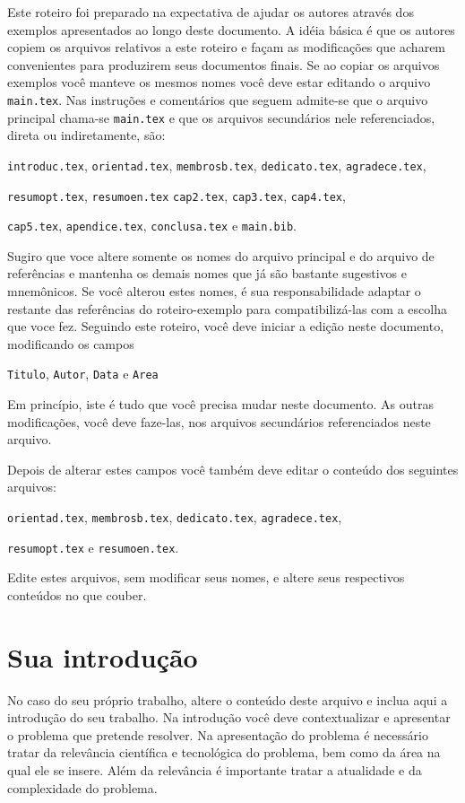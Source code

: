 
Este roteiro foi preparado na expectativa de ajudar os autores através dos
exemplos apresentados ao longo deste documento. A idéia básica é
que os autores copiem os arquivos relativos a este roteiro e façam as
modificações que acharem convenientes para produzirem seus documentos
finais. Se ao copiar os arquivos exemplos você manteve os mesmos nomes
você deve estar editando o arquivo \texttt{main.tex}. Nas
instruções e comentários que seguem admite-se que o arquivo
principal chama-se \texttt{main.tex} e que os arquivos secundários
nele referenciados, direta ou indiretamente, são:

\noindent\texttt{introduc.tex}, \texttt{orientad.tex}, \texttt{membrosb.tex},
\texttt{dedicato.tex}, \texttt{agradece.tex},

\noindent\texttt{resumopt.tex}, \texttt{resumoen.tex}
\texttt{cap2.tex}, \texttt{cap3.tex}, \texttt{cap4.tex},

\noindent\texttt{cap5.tex}, \texttt{apendice.tex},
\texttt{conclusa.tex} e \texttt{main.bib}.

Sugiro que voce altere somente os nomes do arquivo principal e do arquivo de
referências e mantenha os demais nomes que já são bastante
sugestivos e mnemônicos. Se você alterou estes nomes, é sua
responsabilidade adaptar o restante das referências do roteiro-exemplo
para compatibilizá-las com a escolha que voce fez. Seguindo este roteiro,
você deve iniciar a edição neste documento, modificando os campos

\noindent\texttt{Titulo}, \texttt{Autor}, \texttt{Data} e
\texttt{Area}

Em princípio, iste é tudo que você precisa mudar neste documento.
As outras modificações, você deve faze-las, nos arquivos
secundários referenciados neste arquivo.

Depois de alterar estes campos você também deve editar o conteúdo dos seguintes arquivos:

\noindent\texttt{orientad.tex}, \texttt{membrosb.tex}, \texttt{dedicato.tex},
\texttt{agradece.tex},

\noindent\texttt{resumopt.tex} e \texttt{resumoen.tex}.

Edite estes arquivos, sem modificar seus nomes, e altere seus respectivos conteúdos no que couber.

\section{Sua introdução}
No caso do seu próprio trabalho, altere o conteúdo deste arquivo e inclua aqui a introdução do seu trabalho. Na introdução você deve contextualizar e apresentar o problema que pretende resolver. Na apresentação do problema é necessário tratar da relevância científica e tecnológica do problema, bem como da área na qual ele se insere. Além da relevância é importante tratar a atualidade e da complexidade do problema. 

